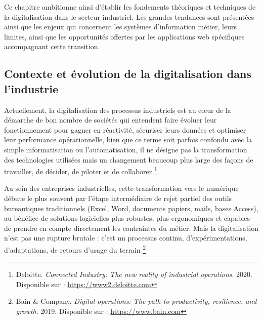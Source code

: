\documentclass[11pt,a4paper]{article}
\begin{document}
Ce chapitre ambitionne ainsi d’établir les fondements théoriques et techniques de la digitalisation dans le secteur industriel. Les grandes tendances sont présentées ainsi que les enjeux qui concernent les systèmes d’information métier, leurs limites, ainsi que les opportunités offertes par les applications web spécifiques accompagnant cette transition.

\subsection{Contexte et évolution de la digitalisation dans l’industrie}

Actuellement, la digitalisation des processus industriels est au cœur de la démarche de bon nombre de sociétés qui entendent faire évoluer leur fonctionnement pour gagner en réactivité, sécuriser leurs données et optimiser leur performance opérationnelle, bien que ce terme soit parfois confondu avec la simple informatisation ou l’automatisation, il ne désigne pas la transformation des technologies utilisées mais un changement beaucoup plus large des façons de travailler, de décider, de piloter et de collaborer \footnote{Deloitte. \textit{Connected Industry: The new reality of industrial operations}. 2020. Disponible sur : \url{https://www2.deloitte.com}}.

Au sein des entreprises industrielles, cette transformation vers le numérique débute le plus souvent par l’étape intermédiaire de rejet partiel des outils bureautiques traditionnels (Excel, Word, documents papiers, mails, bases Access), au bénéfice de solutions logicielles plus robustes, plus ergonomiques et capables de prendre en compte directement les contraintes du métier. Mais la digitalisation n’est pas une rupture brutale : c’est un processus continu, d’expérimentations, d’adaptations, de retours d’usage du terrain \footnote{Bain \& Company. \textit{Digital operations: The path to productivity, resilience, and growth}. 2019. Disponible sur : \url{https://www.bain.com}}
\end{document}
